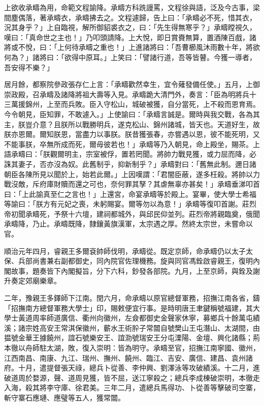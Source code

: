 \begin{pinyinscope}
上欲收承疇為用，命範文程諭降。承疇方科跣謾罵，文程徐與語，泛及今古事，梁間塵偶落，著承疇衣，承疇拂去之。文程遽歸，告上曰：「承疇必不死，惜其衣，況其身乎？」上自臨視，解所御貂裘衣之，曰：「先生得無寒乎？」承疇瞠視久，嘆曰：「真命世之主也！」乃叩頭請降。上大悅，即日賞賚無算，置酒陳百戲，諸將或不悅，曰：「上何待承疇之重也！」上進諸將曰：「吾曹櫛風沐雨數十年，將欲何為？」諸將曰：「欲得中原耳。」上笑曰：「譬諸行道，吾等皆瞽。今獲一導者，吾安得不樂？」

居月餘，都察院參政張存仁上言：「承疇歡然幸生，宜令薙發備任使。」五月，上御崇政殿，召承疇及諸降將祖大壽等入見。承疇跪大清門外，奏言：「臣為明將兵十三萬援錦州，上至而兵敗。臣入守松山，城破被獲，自分當死，上不殺而恩育焉。今令朝見，臣知罪，不敢遽入。」上使諭曰：「承疇言誠是。爾時與我交戰，各為其主，朕豈介意？且朕所以戰勝明兵，遂克松山、錦州諸城，皆天也。天道好生，故朕亦恩爾。爾知朕恩，當盡力以事朕。朕昔獲張春，亦嘗遇以恩，彼不能死明，又不能事朕，卒無所成而死，爾毋彼若也！」承疇等乃入朝見，命上殿坐，賜茶。上語承疇曰：「朕觀爾明主，宗室被俘，置若罔聞。將帥力戰見獲，或力屈而降，必誅其妻子，否亦沒為奴。此舊制乎，抑新制乎？」承疇對曰：「舊無此制。邇日諸朝臣各陳所見以聞於上，始若此爾。」上因嘆謂：「君闇臣蔽，遂多枉殺。將帥以力戰沒敵，斥府庫財贖而還之可也，奈何罪其孥？其虐無辜亦甚矣！」承疇垂涕叩首曰：「上此諭真至仁之言也！」上還宮，命宴承疇等於殿上。宴畢，使大學士希福等諭曰：「朕方有元妃之喪，未躬賜宴。爾等勿以為意！」承疇等復叩首謝。莊烈帝初聞承疇死，予祭十六壇，建祠都城外，與邱民仰並列。莊烈帝將親臨奠，俄聞承疇降，乃止。承疇既降，隸鑲黃旗漢軍，太宗遇之厚。然終太宗世，未嘗命以官。

順治元年四月，睿親王多爾袞帥師伐明，承疇從。既定京師，命承疇仍以太子太保、兵部尚書兼右副都御史，同內院官佐理機務。旋與同官馮銓啟睿親王，復明內閣故事，題奏皆下內閣擬旨，分下六科，鈔發各部院。九月，上至京師，與銓及謝升奏定郊廟樂章。

二年，豫親王多鐸師下江南。閏六月，命承疇以原官總督軍務，招撫江南各省，鑄「招撫南方總督軍務大學士」印，賜敕便宜行事。是時明唐王聿鍵稱號福建，其大學士黃道周率師道廣信、衢州向徽州，左僉都御史金聲家休寧，募鄉兵十餘萬屯績溪；諸宗姓高安王常淇保徽州，蘄水王術肸子常闒自號樊山王屯潛山、太湖間，由揾號金華王據饒州，誼石號樂安王、誼泐號瑞安王分屯溧陽、金壇、興化諸縣；荊本徹以舟師駐太湖，敗，復入崇明：皆為明守。承疇至官，招撫江南寧國、徽州，江西南昌、南康、九江、瑞州、撫州、饒州、臨江、吉安、廣信、建昌、袁州諸府。十月，遣提督張天祿，總兵卜從善、李仲興、劉澤泳等攻破績溪。十二月，進破道周於婺源，聲、道周見獲，皆不屈，送江寧殺之；總兵李成棟破崇明，本徹走入海，殺其將李守庫、徐君美。三年二月，遣總兵馬得功、卜從善等擊破司空寨，斬守寨石應璉、應璧等五人，獲常闒。


\end{pinyinscope}
